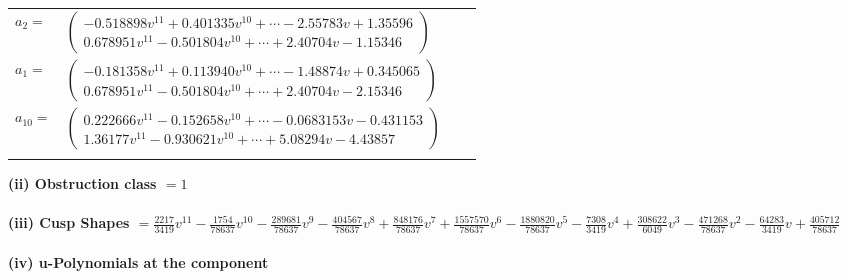 \documentclass[1p]{elsarticle_modified}
\theoremstyle{definition}
\begin{document}
\begin{tabular}{m{7pt} m{180pt} m{7pt} m{180pt} }
\flushright $a_{2}=$&$\begin{pmatrix}-0.518898 v^{11}+0.401335 v^{10}+\cdots-2.55783 v+1.35596\\0.678951 v^{11}-0.501804 v^{10}+\cdots+2.40704 v-1.15346\end{pmatrix}$ \\
\flushright $a_{1}=$&$\begin{pmatrix}-0.181358 v^{11}+0.113940 v^{10}+\cdots-1.48874 v+0.345065\\0.678951 v^{11}-0.501804 v^{10}+\cdots+2.40704 v-2.15346\end{pmatrix}$ \\
\flushright $a_{10}=$&$\begin{pmatrix}0.222666 v^{11}-0.152658 v^{10}+\cdots-0.0683153 v-0.431153\\1.36177 v^{11}-0.930621 v^{10}+\cdots+5.08294 v-4.43857\end{pmatrix}$\\&\end{tabular}
\flushleft \textbf{(ii) Obstruction class $= 1$}\\~\\
\flushleft \textbf{(iii) Cusp Shapes $= \frac{2217}{3419} v^{11}-\frac{1754}{78637} v^{10}-\frac{289681}{78637} v^9-\frac{404567}{78637} v^8+\frac{848176}{78637} v^7+\frac{1557570}{78637} v^6-\frac{1880820}{78637} v^5-\frac{7308}{3419} v^4+\frac{308622}{6049} v^3-\frac{471268}{78637} v^2-\frac{64283}{3419} v+\frac{405712}{78637}$}\\~\\
\newpage\renewcommand{\arraystretch}{1}
\flushleft \textbf{(iv) u-Polynomials at the component}\newline \\
\end{document}
